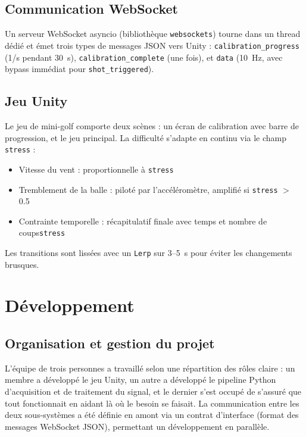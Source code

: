 \documentclass[runningheads]{llncs}
\begin{document}
\subsection{Communication WebSocket}

Un serveur WebSocket asyncio (bibliothèque \texttt{websockets}) tourne
dans un thread dédié et émet trois types de messages JSON vers Unity :
\texttt{calibration\_progress} (1/s pendant 30~s),
\texttt{calibration\_complete} (une fois), et \texttt{data} (10~Hz,
avec bypass immédiat pour \texttt{shot\_triggered}).

\subsection{Jeu Unity}

Le jeu de mini-golf comporte deux scènes : un écran de calibration avec
barre de progression, et le jeu principal. La difficulté s'adapte en
continu via le champ \texttt{stress} :

\begin{itemize}
  \item Vitesse du vent : proportionnelle à \texttt{stress}
  \item Tremblement de la balle : piloté par l'accéléromètre, amplifié si \texttt{stress} $>$ 0.5
  \item Contrainte temporelle : récapitulatif finale avec temps et nombre de coups\texttt{stress}
\end{itemize}

Les transitions sont lissées avec un \texttt{Lerp} sur 3--5~s pour éviter
les changements brusques.

\section{Développement}

\subsection{Organisation et gestion du projet}

L'équipe de trois personnes a travaillé selon une répartition des rôles
claire : un membre a développé le jeu Unity, un autre a développé le pipeline Python d'acquisition et de traitement du signal, et le dernier s'est occupé de s'assuré que tout fonctionnait en aidant là où le besoin se faisait.
La communication entre les deux sous-systèmes a été définie en amont via
un contrat d'interface (format des messages WebSocket JSON), permettant
un développement en parallèle.
\end{document}

